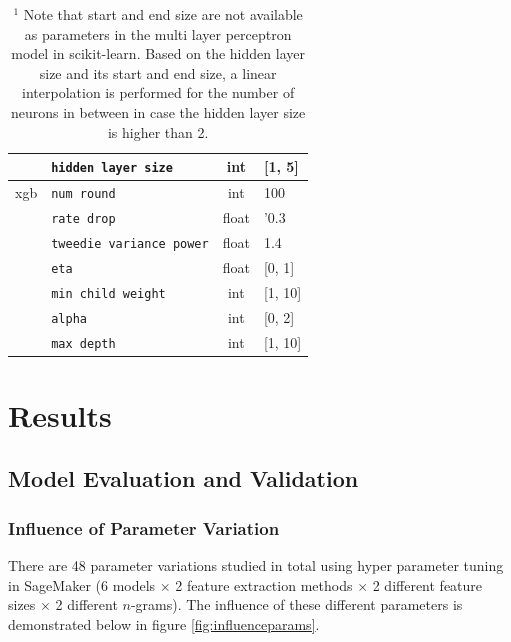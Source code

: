 \documentclass[a4paper,12pt,nottoc]{article}
\begin{document}
\begin{table}[h]
\begin{center}
\begin{tabular}{| c | l | c | l |}
& \texttt{hidden layer size} & int & [1, 5] \\
\hline 
xgb \cite{bib:xgb} & \texttt{num round} & int & 100 \\
& \texttt{rate drop} & float & '0.3 \\
& \texttt{tweedie variance power} & float & 1.4 \\
& \texttt{eta} & float & [0, 1] \\
& \texttt{min child weight} & int & [1, 10] \\
& \texttt{alpha} & int & [0, 2] \\
& \texttt{max depth} & int & [1, 10] \\
\hline 
\end{tabular}
\caption{$^\textrm{1}$ Note that start and end size are not available as parameters in the multi layer perceptron model in scikit-learn. Based on the hidden layer size and its start and end size, a linear interpolation is performed for the number of neurons in between in case the hidden layer size is higher than 2.}\label{tab:hyperparam}
\end{center}
\end{table}

\clearpage
\section{Results}

\subsection{Model Evaluation and Validation}

\subsubsection{Influence of Parameter Variation}

There are 48 parameter variations studied in total using hyper parameter tuning in SageMaker \cite{bib:sagemaker} (6 models $\times$ 2 feature extraction methods $\times$ 2 different feature sizes $\times$ 2 different $n$-grams). The influence of these different parameters is demonstrated below in figure \ref{fig:influenceparams}.
\end{document}

